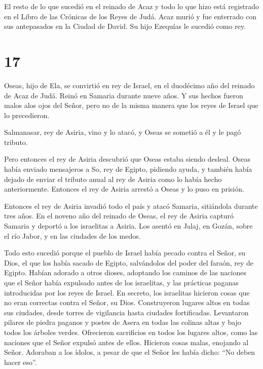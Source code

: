  El resto de lo que sucedió en el reinado de Acaz y todo lo
que hizo está registrado en el Libro de las Crónicas de los Reyes de
Judá.  Acaz murió y fue enterrado con sus antepasados en la
Ciudad de David. Su hijo Ezequías le sucedió como rey.

\hypertarget{section-16}{%
\section{17}\label{section-16}}

 Oseas, hijo de Ela, se convirtió en rey de Israel, en el
duodécimo año del reinado de Acaz de Judá. Reinó en Samaria durante
nueve años.  Y sus hechos fueron malos alos ojos del Señor,
pero no de la misma manera que los reyes de Israel que lo precedieron.

 Salmanasar, rey de Asiria, vino y lo atacó, y Oseas se
sometió a él y le pagó tributo.

 Pero entonces el rey de Asiria descubrió que Oseas estaba
siendo desleal. Oseas había enviado mensajeros a So, rey de Egipto,
pidiendo ayuda, y también había dejado de enviar el tributo anual al rey
de Asiria como lo había hecho anteriormente. Entonces el rey de Asiria
arrestó a Oseas y lo puso en prisión.

 Entonces el rey de Asiria invadió todo el país y atacó
Samaria, sitiándola durante tres años.  En el noveno año del
reinado de Oseas, el rey de Asiria capturó Samaria y deportó a los
israelitas a Asiria. Los asentó en Jalaj, en Gozán, sobre el río Jabor,
y en las ciudades de los medos.

 Todo esto sucedió porque el pueblo de Israel había pecado
contra el Señor, su Dios, el que los había sacado de Egipto, salvándolos
del poder del faraón, rey de Egipto. Habían adorado a otros dioses,
 adoptando los caminos de las naciones que el Señor había
expulsado antes de los israelitas, y las prácticas paganas introducidas
por los reyes de Israel.  En secreto, los israelitas
hicieron cosas que no eran correctas contra el Señor, su Dios.
Construyeron lugares altos en todas sus ciudades, desde torres de
vigilancia hasta ciudades fortificadas.  Levantaron pilares
de piedra paganos y postes de Asera en todas las colinas altas y bajo
todos los árboles verdes.  Ofrecieron sacrificios en todos
los lugares altos, como las naciones que el Señor expulsó antes de
ellos. Hicieron cosas malas, enojando al Señor.  Adoraban a
los ídolos, a pesar de que el Señor les había dicho: ``No deben hacer
eso''.

